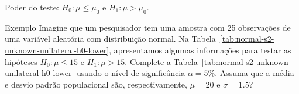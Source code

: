 \documentclass[8pt]{beamer}
\begin{document}
\begin{frame}{Poder do teste: $H_0:\mu \leq \mu_0$ e $H_1: \mu > \mu_0$.}

\large

\begin{block}{Exemplo}
	Imagine que um pesquisador tem uma amostra com 25 observações de uma variável aleatória com distribuição normal. Na Tabela~\ref{tab:normal-s2-unknown-unilateral-h0-lower}, apresentamos algumas informações para testar as hipóteses $H_0: \mu \leq 15$ e $H_1: \mu > 15$. Complete a Tabela~\ref{tab:normal-s2-unknown-unilateral-h0-lower} usando o nível de significância $\alpha=5\%$. Assuma que a média e desvio padrão populacional são, respectivamente, $\mu=20$ e $\sigma=1.5$?
	\begin{table}[ht]
		\centering
		\caption{Algumas informações do experimento.} 
		\label{tab:normal-s2-unknown-unilateral-h0-lower}
	\end{table}
\end{block}

\normalsize

\end{frame}
\end{document}

